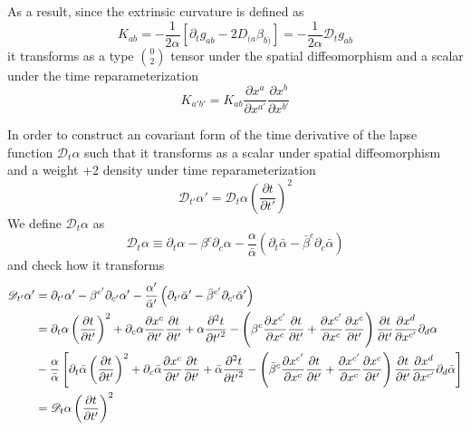 \documentclass[letterpaper,nofootinbib,prd,amsmath,onecolumn]{revtex4-1}
\begin{document}
As a result, since the extrinsic curvature is defined as
\begin{equation}
K_{ab} = -\frac{1}{2\alpha}\left[\partial_{t}g_{ab} - 2D_{(a}\beta_{b)}\right] = -\frac{1}{2\alpha}\mathscr{D}_{t}g_{ab}
\end{equation}
it transforms as a type $0 \choose 2$ tensor under the spatial diffeomorphism and a scalar under the time reparameterization
\begin{equation}
K_{a'b'} = K_{ab}\frac{\partial x^{a}}{\partial x^{a'}}\frac{\partial x^{b}}{\partial x^{b'}}
\end{equation}

In order to construct an covariant form of the time derivative of the lapse function $\mathscr{D}_{t}\alpha$ such that it transforms as a scalar under spatial diffeomorphism and a weight +2 density under time reparameterization
\[
\mathscr{D}_{t'}\alpha' = \mathscr{D}_{t}\alpha\left(\frac{\partial t}{\partial t'}\right)^{2}
\]
We define $\mathscr{D}_{t}\alpha$ as
\begin{equation}
\mathscr{D}_{t}\alpha \equiv \partial_{t}\alpha - \beta^{c}\partial_{c}\alpha - \frac{\alpha}{{\bar \alpha}}\left(\partial_{t}{\bar \alpha} - {\bar \beta}^{c}\partial_{c}{\bar \alpha}\right)
\end{equation}
and check how it transforms
\begin{align}
\mathscr{D}_{t'}\alpha' & = \partial_{t'}\alpha' - \beta^{c'}\partial_{c'}\alpha' - \frac{\alpha'}{{\bar \alpha}'}\left(\partial_{t'}{\bar \alpha}' - {\bar \beta}^{c'}\partial_{c'}{\bar \alpha}'\right)\notag\\
& = \partial_{t}\alpha\left(\frac{\partial t}{\partial t'}\right)^{2} + \partial_{c}\alpha\frac{\partial x^{c}}{\partial t'}\frac{\partial t}{\partial t'} + \alpha\frac{\partial^{2}t}{\partial {t'}^{2}} - \left(\beta^{c}\frac{\partial x^{c'}}{\partial x^{c}}\frac{\partial t}{\partial t'} + \frac{\partial x^{c'}}{\partial x^{c}}\frac{\partial x^{c}}{\partial t'}\right)\frac{\partial t}{\partial t'}\frac{\partial x^{d}}{\partial x^{c'}}\partial_{d}\alpha\notag\\
& - \frac{\alpha}{{\bar \alpha}}\left[\partial_{t}{\bar \alpha}\left(\frac{\partial t}{\partial t'}\right)^{2} + \partial_{c}{\bar \alpha}\frac{\partial x^{c}}{\partial t'}\frac{\partial t}{\partial t'} + {\bar \alpha}\frac{\partial^{2}t}{\partial {t'}^{2}} - \left({\bar\beta}^{c}\frac{\partial x^{c'}}{\partial x^{c}}\frac{\partial t}{\partial t'} + \frac{\partial x^{c'}}{\partial x^{c}}\frac{\partial x^{c}}{\partial t'}\right)\frac{\partial t}{\partial t'}\frac{\partial x^{d}}{\partial x^{c'}}\partial_{d}{\bar\alpha}\right]\notag\\
& = \mathscr{D}_{t}\alpha\left(\frac{\partial t}{\partial t'}\right)^{2}
\end{align}
\end{document}
